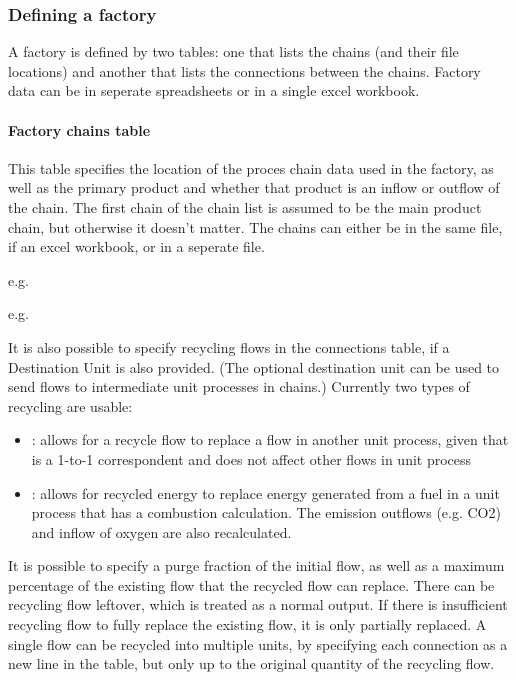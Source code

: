 \documentclass[a4paper,10pt,english]{sphinxmanual}
\begin{document}
\subsubsection{Defining a factory}
\label{\detokenize{intro:defining-a-factory}}
A factory is defined by two tables: one that lists the chains (and their file locations) and another that lists the connections between the chains. Factory data can be in seperate spreadsheets or in a single excel workbook.


\paragraph{Factory chains table}
\label{\detokenize{intro:factory-chains-table}}
This table specifies the location of the proces chain data used in the factory, as well as the  primary product and whether that product is an inflow or outflow of the chain.
The first chain of the chain list is assumed to be the main product chain, but otherwise it doesn’t matter.
The chains can either be in the same file, if an excel workbook, or in a seperate file.

e.g.



e.g.



It is also possible to specify recycling flows in the connections table, if a Destination Unit is also provided. (The optional destination unit can be used to send flows to intermediate unit processes in chains.) Currently two types of recycling are usable:
\begin{itemize}
\item {} 
: allows for a recycle flow to replace a flow in another unit process, given that is a 1-to-1 correspondent and does not affect other flows in unit process

\item {} 
: allows for recycled energy to replace energy generated from a fuel in a unit process that has a combustion calculation. The emission outflows (e.g. CO2) and inflow of oxygen are also recalculated.

\end{itemize}

It is possible to specify a purge fraction of the initial flow, as well as a maximum percentage of the existing flow that the recycled flow can replace. There can be recycling flow leftover, which is treated as a normal output. If there is insufficient recycling flow to fully replace the existing flow, it is only partially replaced. A single flow can be recycled into multiple units, by specifying each connection as a new line in the table, but only up to the original quantity of the recycling flow.
\end{document}
